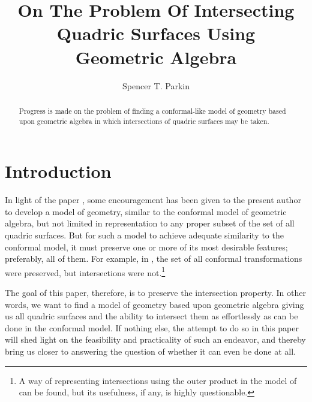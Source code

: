 \documentclass{birkjour}
\theoremstyle{definition}
\theoremstyle{remark}
\numberwithin{equation}{section}
\begin{document}
\title{On The Problem Of Intersecting\\Quadric Surfaces Using\\Geometric Algebra}

\author{Spencer T. Parkin}
\address{102 W. 500 S., \\
Salt Lake City, UT  84101} 



\begin{abstract}
Progress is made on the problem of finding a conformal-like model of geometry
based upon geometric algebra in which intersections of quadric surfaces
may be taken.
\end{abstract}


\maketitle

\section{Introduction}

In light of the paper \cite{Parkin13}, some encouragement has been given to the present
author to develop a model of geometry, similar to the conformal model of geometric
algebra, but not limited in representation to any proper subset of the set of all
quadric surfaces.  But for such a model to achieve adequate similarity to the conformal model,
it must preserve one or more of its most desirable features; preferably, all of them.
For example, in \cite{Parkin13}, the set of all conformal transformations were preserved, but
intersections were not.\footnote{A way of representing intersections using the outer
product in the model of \cite{Parkin13} can be found, but its usefulness, if any, is highly questionable.}

The goal of this paper, therefore, is to
preserve the intersection property.  In other words, we want to find a model of geometry based upon
geometric algebra giving us all quadric surfaces and the ability to intersect them
as effortlessly as can be done in the conformal model.  If nothing else, the attempt
to do so in this paper will shed light on the feasibility and practicality of such an endeavor, and thereby
bring us closer to answering the question of whether it can even be done at all.
\end{document}
